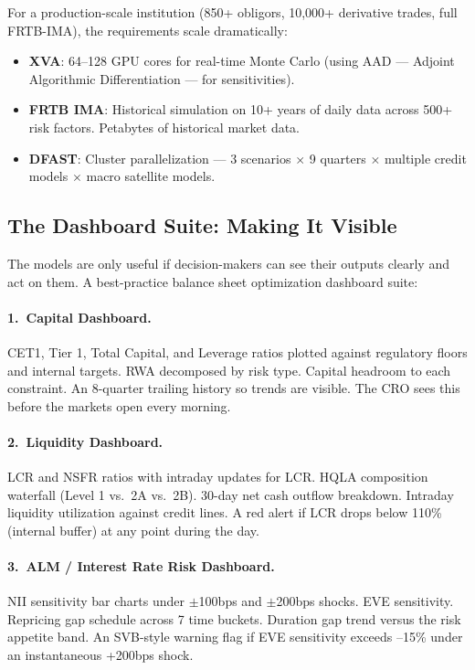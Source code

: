 \documentclass[12pt,a4paper]{article}
\begin{document}
For a production-scale institution (850+ obligors, 10,000+ derivative trades,
full FRTB-IMA), the requirements scale dramatically:
\begin{itemize}[noitemsep]
  \item \textbf{XVA}: 64--128 GPU cores for real-time Monte Carlo (using
        AAD --- Adjoint Algorithmic Differentiation --- for sensitivities).
  \item \textbf{FRTB IMA}: Historical simulation on 10+ years of daily data
        across 500+ risk factors.  Petabytes of historical market data.
  \item \textbf{DFAST}: Cluster parallelization --- 3 scenarios $\times$ 9
        quarters $\times$ multiple credit models $\times$ macro satellite
        models.
\end{itemize}

\subsection{The Dashboard Suite: Making It Visible}

The models are only useful if decision-makers can see their outputs clearly
and act on them.  A best-practice balance sheet optimization dashboard suite:

\paragraph{1.\ Capital Dashboard.}
CET1, Tier 1, Total Capital, and Leverage ratios plotted against regulatory
floors and internal targets.  RWA decomposed by risk type.  Capital headroom
to each constraint.  An 8-quarter trailing history so trends are visible.
The CRO sees this before the markets open every morning.

\paragraph{2.\ Liquidity Dashboard.}
LCR and NSFR ratios with intraday updates for LCR.  HQLA composition waterfall
(Level 1 vs.\ 2A vs.\ 2B).  30-day net cash outflow breakdown.  Intraday
liquidity utilization against credit lines.  A red alert if LCR drops below
110\% (internal buffer) at any point during the day.

\paragraph{3.\ ALM / Interest Rate Risk Dashboard.}
NII sensitivity bar charts under $\pm$100bps and $\pm$200bps shocks.
EVE sensitivity.  Repricing gap schedule across 7 time buckets.
Duration gap trend versus the risk appetite band.  An SVB-style warning
flag if EVE sensitivity exceeds --15\% under an instantaneous +200bps shock.
\end{document}
